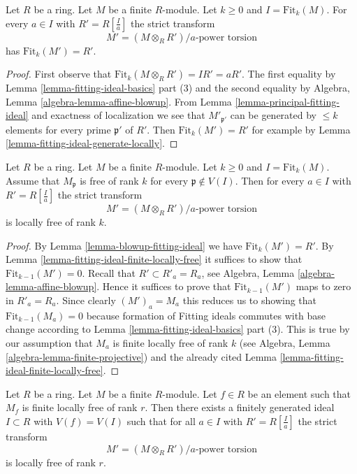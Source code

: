 \begin{lemma}
\label{lemma-blowup-fitting-ideal}
Let $R$ be a ring. Let $M$ be a finite $R$-module.
Let $k \geq 0$ and $I = \text{Fit}_k(M)$. For every $a \in I$
with $R' = R[\frac{I}{a}]$ the strict transform
$$
M' = (M \otimes_R R')/a\text{-power torsion}
$$
has $\text{Fit}_k(M') = R'$.
\end{lemma}

\begin{proof}
First observe that $\text{Fit}_k(M \otimes_R R') = IR' = aR'$.
The first equality by Lemma \ref{lemma-fitting-ideal-basics} part (3)
and the second equality by
Algebra, Lemma \ref{algebra-lemma-affine-blowup}.
From Lemma \ref{lemma-principal-fitting-ideal}
and exactness of localization
we see that $M'_{\mathfrak p'}$
can be generated by $\leq k$ elements for every prime $\mathfrak p'$
of $R'$. Then $\text{Fit}_k(M') = R'$ for example by
Lemma \ref{lemma-fitting-ideal-generate-locally}.
\end{proof}

\begin{lemma}
\label{lemma-blowup-fitting-ideal-locally-free}
Let $R$ be a ring. Let $M$ be a finite $R$-module.
Let $k \geq 0$ and $I = \text{Fit}_k(M)$. Assume that
$M_\mathfrak p$ is free of rank $k$ for every
$\mathfrak p \not \in V(I)$. Then for every $a \in I$
with $R' = R[\frac{I}{a}]$ the strict transform
$$
M' = (M \otimes_R R')/a\text{-power torsion}
$$
is locally free of rank $k$.
\end{lemma}

\begin{proof}
By Lemma \ref{lemma-blowup-fitting-ideal} we have
$\text{Fit}_k(M') = R'$. By Lemma \ref{lemma-fitting-ideal-finite-locally-free}
it suffices to show that $\text{Fit}_{k - 1}(M') = 0$.
Recall that $R' \subset R'_a = R_a$, see
Algebra, Lemma \ref{algebra-lemma-affine-blowup}.
Hence it suffices to prove that $\text{Fit}_{k - 1}(M')$
maps to zero in $R'_a = R_a$.
Since clearly $(M')_a = M_a$ this reduces us to showing
that $\text{Fit}_{k - 1}(M_a) = 0$
because formation of Fitting ideals commutes with base
change according to Lemma \ref{lemma-fitting-ideal-basics} part (3).
This is true by our assumption that
$M_a$ is finite locally free of rank $k$
(see Algebra, Lemma \ref{algebra-lemma-finite-projective})
and the already cited Lemma \ref{lemma-fitting-ideal-finite-locally-free}.
\end{proof}

\begin{lemma}
\label{lemma-blowup-module}
Let $R$ be a ring. Let $M$ be a finite $R$-module. Let $f \in R$
be an element such that $M_f$ is finite locally free of rank $r$.
Then there exists a finitely generated ideal $I \subset R$ with
$V(f) = V(I)$ such that for all $a \in I$ with $R' = R[\frac{I}{a}]$
the strict transform
$$
M' = (M \otimes_R R')/a\text{-power torsion}
$$
is locally free of rank $r$.
\end{lemma}

